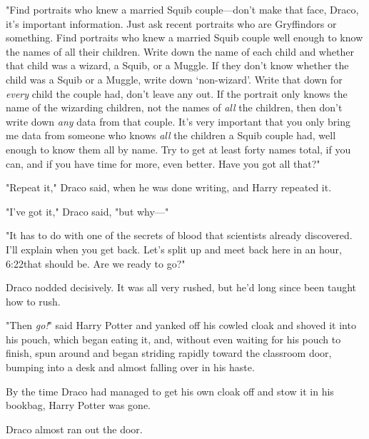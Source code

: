 "Find portraits who knew a married Squib couple—don't make that face, Draco,
it's important information. Just ask recent portraits who are Gryffindors or
something. Find portraits who knew a married Squib couple well enough to know
the names of all their children. Write down the name of each child and whether
that child was a wizard, a Squib, or a Muggle. If they don't know whether the
child was a Squib or a Muggle, write down `non-wizard'. Write that down for
\emph{every} child the couple had, don't leave any out. If the portrait only
knows the name of the wizarding children, not the names of \emph{all} the
children, then don't write down \emph{any} data from that couple. It's very
important that you only bring me data from someone who knows \emph{all} the
children a Squib couple had, well enough to know them all by name. Try to get
at least forty names total, if you can, and if you have time for more, even
better. Have you got all that?"

"Repeat it," Draco said, when he was done writing, and Harry repeated it.

"I've got it," Draco said, "but why—"

"It has to do with one of the secrets of blood that scientists already
discovered. I'll explain when you get back. Let's split up and meet back here
in an hour, 6:22\PM that should be. Are we ready to go?"

Draco nodded decisively. It was all very rushed, but he'd long since been
taught how to rush.

"Then \emph{go!}" said Harry Potter and yanked off his cowled cloak and shoved
it into his pouch, which began eating it, and, without even waiting for his
pouch to finish, spun around and began striding rapidly toward the classroom
door, bumping into a desk and almost falling over in his haste.

By the time Draco had managed to get his own cloak off and stow it in his
bookbag, Harry Potter was gone.

Draco almost ran out the door.
